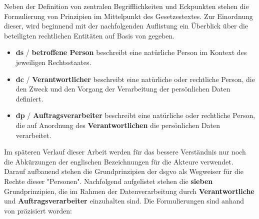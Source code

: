 \noindent Neben der Definition von zentralen Begrifflichkeiten und Eckpunkten stehen die Formulierung von Prinzipien im Mittelpunkt des Gesetzestextes. Zur Einordnung dieser, wird beginnend mit der nachfolgenden Auflistung ein Überblick über die beteiligten rechtlichen Entitäten auf Basis von \cite{DSGVOArt4} gegeben.

\begin{itemize}
    \item \textbf{\acl{ds}} / \textbf{betroffene Person} beschreibt eine natürliche Person im Kontext des jeweiligen Rechtsstaates.
    \item \textbf{\acl{dc}} / \textbf{Verantwortlicher} beschreibt eine natürliche oder rechtliche Person, die den Zweck und den Vorgang der Verarbeitung der persönlichen Daten definiert.
    \item \textbf{\acl{dp}} / \textbf{Auftragsverarbeiter} beschreibt eine natürliche oder rechtliche Person, die auf Anordnung des \textbf{Verantwortlichen} die persönlichen Daten verarbeitet.
\end{itemize}

\noindent Im späteren Verlauf dieser Arbeit werden für das bessere Verständnis nur noch die Abkürzungen der englischen Bezeichnungen für die Akteure verwendet. Darauf aufbauend stehen die Grundprinzipien der \ac{dsgvo} als Wegweiser für die Rechte dieser "Personen". 
Nachfolgend aufgelistet stehen die \textbf{sieben} Grundprinzipien, die im Rahmen der Datenverarbeitung durch \textbf{Verantwortliche} und \textbf{Auftragsverarbeiter} einzuhalten sind. Die Formulierungen sind anhand von \cite{DSGVOArt5} präzisiert worden:

